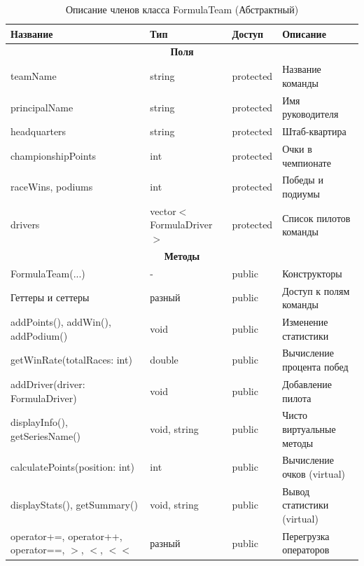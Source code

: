 \begin{table}[htbp]
\centering
\caption{Описание членов класса FormulaTeam (Абстрактный)}
\begin{tabular}{|p{5.5cm}|p{3cm}|p{2cm}|p{5cm}|}
\hline
\textbf{Название} & \textbf{Тип} & \textbf{Доступ} & \textbf{Описание} \\ \hline
\multicolumn{4}{|c|}{\textbf{Поля}} \\ \hline
teamName & string & protected & Название команды \\ \hline
principalName & string & protected & Имя руководителя \\ \hline
headquarters & string & protected & Штаб-квартира \\ \hline
championshipPoints & int & protected & Очки в чемпионате \\ \hline
raceWins, podiums & int & protected & Победы и подиумы \\ \hline
drivers & vector$<$FormulaDriver$>$ & protected & Список пилотов команды \\ \hline
\multicolumn{4}{|c|}{\textbf{Методы}} \\ \hline
FormulaTeam(...) & - & public & Конструкторы \\ \hline
Геттеры и сеттеры & разный & public & Доступ к полям команды \\ \hline
addPoints(), addWin(), addPodium() & void & public & Изменение статистики \\ \hline
getWinRate(totalRaces: int) & double & public & Вычисление процента побед \\ \hline
addDriver(driver: FormulaDriver) & void & public & Добавление пилота \\ \hline
displayInfo(), getSeriesName() & void, string & public & Чисто виртуальные методы \\ \hline
calculatePoints(position: int) & int & public & Вычисление очков (virtual) \\ \hline
displayStats(), getSummary() & void, string & public & Вывод статистики (virtual) \\ \hline
operator+=, operator++, operator==, $>$, $<$, $<<$ & разный & public & Перегрузка операторов \\ \hline
\end{tabular}
\end{table}

